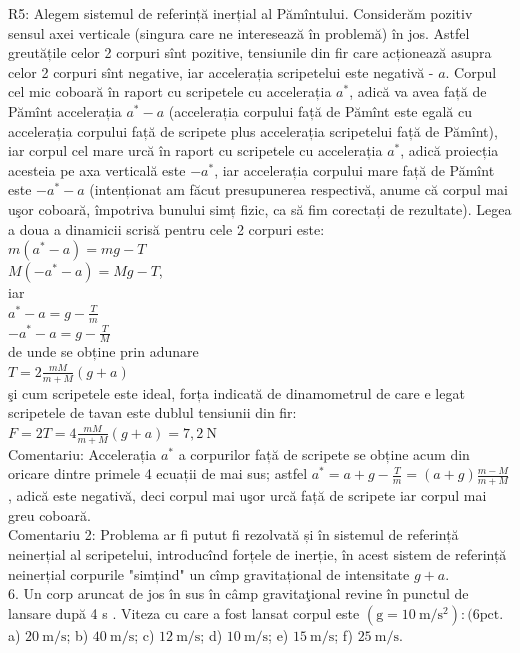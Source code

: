 R5: Alegem sistemul de referință inerțial al Pămîntului. Considerăm pozitiv sensul axei verticale (singura care ne interesează în problemă) în jos. Astfel greutățile celor 2 corpuri sînt pozitive, tensiunile din fir care acționează asupra celor 2 corpuri sînt negative, iar accelerația scripetelui este negativă - $a$. Corpul cel mic coboară în raport cu scripetele cu accelerația $a^{*}$, adică va avea față de Pămînt accelerația $a^{*}-a$ (accelerația corpului față de Pămînt este egală cu accelerația corpului față de scripete plus accelerația scripetelui față de Pămînt), iar corpul cel mare urcă în raport cu scripetele cu accelerația $a^{*}$, adică proiecția acesteia pe axa verticală este $-a^{*}$, iar accelerația corpului mare față de Pămînt este $-a^{*}-a$ (intenționat am făcut presupunerea respectivă, anume că corpul mai uşor coboară, împotriva bunului simț fizic, ca să fim corectați de rezultate). Legea a doua a dinamicii scrisă pentru cele 2 corpuri este:\\
$m\left(a^{*}-a\right)=m g-T$\\
$M\left(-a^{*}-a\right)=M g-T$,\\
iar\\
$a^{*}-a=g-\frac{T}{m}$\\
$-a^{*}-a=g-\frac{T}{M}$\\
de unde se obține prin adunare\\
$T=2 \frac{m M}{m+M}(g+a)$\\
şi cum scripetele este ideal, forța indicată de dinamometrul de care e legat scripetele de tavan este dublul tensiunii din fir:\\
$F=2 T=4 \frac{m M}{m+M}(g+a)=7,2 \mathrm{~N}$\\
Comentariu: Accelerația $a^{*}$ a corpurilor față de scripete se obține acum din oricare dintre primele 4 ecuații de mai sus; astfel $a^{*}=a+g-\frac{T}{m}=(a+g) \frac{m-M}{m+M}$, adică este negativă, deci corpul mai uşor urcă față de scripete iar corpul mai greu coboară.\\
Comentariu 2: Problema ar fi putut fi rezolvată și în sistemul de referință neinerțial al scripetelui, introducînd forțele de inerție, în acest sistem de referință neinerțial corpurile "simțind" un cîmp gravitațional de intensitate $g+a$.\\
6. Un corp aruncat de jos în sus în câmp gravitaţional revine în punctul de lansare după 4 s . Viteza cu care a fost lansat corpul este $\left(\mathrm{g}=10 \mathrm{~m} / \mathrm{s}^{2}\right):(6 \mathrm{pct}$.\\
a) $20 \mathrm{~m} / \mathrm{s}$; b) $40 \mathrm{~m} / \mathrm{s}$; c) $12 \mathrm{~m} / \mathrm{s}$; d) $10 \mathrm{~m} / \mathrm{s}$; e) $15 \mathrm{~m} / \mathrm{s}$; f) $25 \mathrm{~m} / \mathrm{s}$.

